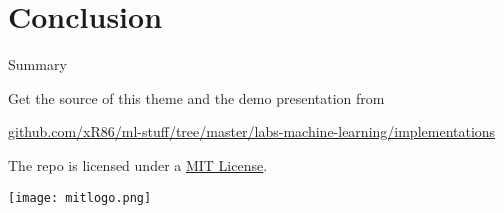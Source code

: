 \documentclass[10pt]{beamer}
\begin{document}
\section{Conclusion}

\begin{frame}{Summary}

  Get the source of this theme and the demo presentation from

  \begin{center}\url{github.com/xR86/ml-stuff/tree/master/labs-machine-learning/implementations}\end{center}

  The repo is licensed under a
  \href{https://github.com/xR86/ml-stuff/blob/master/LICENSE}{MIT License}.

  \begin{center}\texttt{[image: mitlogo.png]}\end{center}
  

\end{frame}
\end{document}
